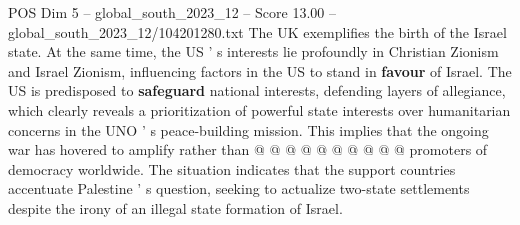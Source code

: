 \begin{textsample}{POS Dim 5 – global\_south\_2023\_12 – Score 13.00 – global\_south\_2023\_12/104201280.txt}
The UK exemplifies the birth of the Israel state.
At the same time, the US ' s interests lie profoundly in Christian Zionism and Israel Zionism, influencing factors in the US to stand in \textbf{favour} of Israel.
The US is predisposed to \textbf{safeguard} national interests, defending layers of allegiance, which clearly reveals a prioritization of powerful state interests over humanitarian concerns in the UNO ' s peace-building mission.
This implies that the ongoing war has hovered to amplify rather than @ @ @ @ @ @ @ @ @ @ promoters of democracy worldwide.
The situation indicates that the support countries accentuate Palestine ' s question, seeking to actualize two-state settlements despite the irony of an illegal state formation of Israel.

\end{textsample}
